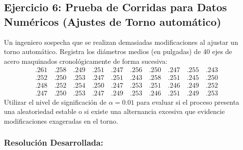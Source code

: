 \documentclass[11pt,a4paper]{article}
\begin{document}
\newpage
\subsection{Ejercicio 6: Prueba de Corridas para Datos Numéricos (Ajustes de Torno automático)} \label{ej:racha_num}

\begin{tcolorbox}[colback=white,colframe=blue!60!black,title=Enunciado]
    Un ingeniero sospecha que se realizan demasiadas modificaciones al ajustar un torno automático. Registra los diámetros medios (en pulgadas) de 40 ejes de acero maquinados cronológicamente de forma sucesiva:
    \begin{align*}
        .261 \quad .258 \quad .249 \quad .251 \quad .247 \quad .256 \quad .250 \quad .247 \quad .255 \quad .243 \\
        .252 \quad .250 \quad .253 \quad .247 \quad .251 \quad .243 \quad .258 \quad .251 \quad .245 \quad .250 \\
        .248 \quad .252 \quad .254 \quad .250 \quad .247 \quad .253 \quad .251 \quad .246 \quad .249 \quad .252 \\
        .247 \quad .250 \quad .253 \quad .247 \quad .249 \quad .253 \quad .246 \quad .251 \quad .249 \quad .253
    \end{align*}
    Utilizar el nivel de significación de $\alpha = 0.01$ para evaluar si el proceso presenta una aleatoriedad estable o si existe una alternancia excesiva que evidencie modificaciones exageradas en el torno.
\end{tcolorbox}

\subsubsection*{Resolución Desarrollada:}
\end{document}
